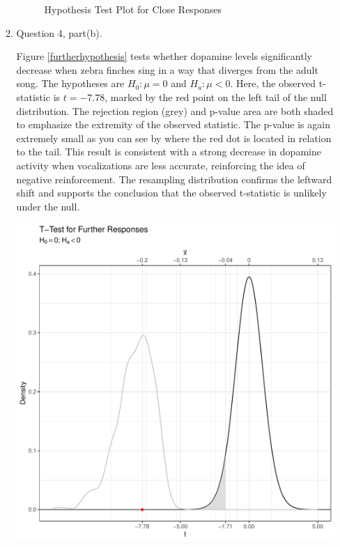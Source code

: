 \documentclass{article}\usepackage[]{graphicx}\usepackage[]{xcolor}
\makeatletter
\def\maxwidth{ %
  \ifdim\Gin@nat@width>\linewidth
    \linewidth
  \else
    \Gin@nat@width
  \fi
}
\newenvironment{knitrout}{}{} %
\makeatother
\begin{document}
\begin{enumerate}
\begin{enumerate}
\begin{figure}[H]
\begin{center}
\caption{Hypothesis Test Plot for Close Responses}
\label{closehypothesis} %
\end{center}
\end{figure}
  
  \item Question 4, part(b).
  
  Figure \ref{furtherhypothesis} tests whether dopamine levels significantly decrease
  when zebra finches sing in a way that diverges from the adult song. The hypotheses
  are $H_0: \mu = 0$ and $H_a: \mu < 0$. Here, the observed t-statistic is $t=-7.78$,
  marked by the red point on the left tail of the null distribution. The rejection
  region (grey) and p-value area are both shaded to emphasize the extremity of the observed
  statistic. The p-value is again extremely small as you can see by where the red dot is
  located in relation to the tail. This result is consistent with a strong decrease
  in dopamine activity when vocalizations are less accurate, reinforcing the idea of 
  negative reinforcement. The resampling distribution confirms the leftward shift
  and supports the conclusion that the observed t-statistic is unlikely under the null.
  
\begin{knitrout}\scriptsize
{}\color{fgcolor}
\includegraphics[width=\maxwidth]{figure/plot3-1} 
\end{knitrout}
  

\end{enumerate}
\end{enumerate}
\end{document}
